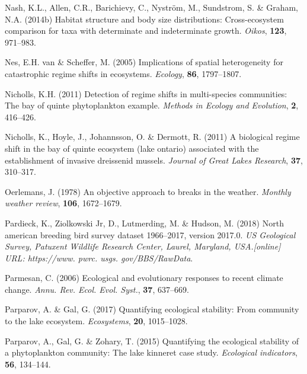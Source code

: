 \documentclass[12pt,twoside,openany]{reedthesis}
\begin{document}
\leavevmode\hypertarget{ref-nash2014habitat}{}%
Nash, K.L., Allen, C.R., Barichievy, C., Nyström, M., Sundstrom, S. \& Graham, N.A. (2014b) Habitat structure and body size distributions: Cross-ecosystem comparison for taxa with determinate and indeterminate growth. \emph{Oikos}, \textbf{123}, 971--983.

\leavevmode\hypertarget{ref-van2005implications}{}%
Nes, E.H. van \& Scheffer, M. (2005) Implications of spatial heterogeneity for catastrophic regime shifts in ecosystems. \emph{Ecology}, \textbf{86}, 1797--1807.

\leavevmode\hypertarget{ref-nicholls_detection_2011}{}%
Nicholls, K.H. (2011) Detection of regime shifts in multi-species communities: The bay of quinte phytoplankton example. \emph{Methods in Ecology and Evolution}, \textbf{2}, 416--426.

\leavevmode\hypertarget{ref-nicholls2011biological}{}%
Nicholls, K., Hoyle, J., Johannsson, O. \& Dermott, R. (2011) A biological regime shift in the bay of quinte ecosystem (lake ontario) associated with the establishment of invasive dreissenid mussels. \emph{Journal of Great Lakes Research}, \textbf{37}, 310--317.

\leavevmode\hypertarget{ref-oerlemans1978objective}{}%
Oerlemans, J. (1978) An objective approach to breaks in the weather. \emph{Monthly weather review}, \textbf{106}, 1672--1679.

\leavevmode\hypertarget{ref-pardieck2018north}{}%
Pardieck, K., Ziolkowski Jr, D., Lutmerding, M. \& Hudson, M. (2018) North american breeding bird survey dataset 1966--2017, version 2017.0. \emph{US Geological Survey, Patuxent Wildlife Research Center, Laurel, Maryland, USA.{[}online{]} URL: https://www. pwrc. usgs. gov/BBS/RawData}.

\leavevmode\hypertarget{ref-parmesan_ecological_2006}{}%
Parmesan, C. (2006) Ecological and evolutionary responses to recent climate change. \emph{Annu. Rev. Ecol. Evol. Syst.}, \textbf{37}, 637--669.

\leavevmode\hypertarget{ref-parparov2017quantifying}{}%
Parparov, A. \& Gal, G. (2017) Quantifying ecological stability: From community to the lake ecosystem. \emph{Ecosystems}, \textbf{20}, 1015--1028.

\leavevmode\hypertarget{ref-parparov2015quantifying}{}%
Parparov, A., Gal, G. \& Zohary, T. (2015) Quantifying the ecological stability of a phytoplankton community: The lake kinneret case study. \emph{Ecological indicators}, \textbf{56}, 134--144.
\end{document}
